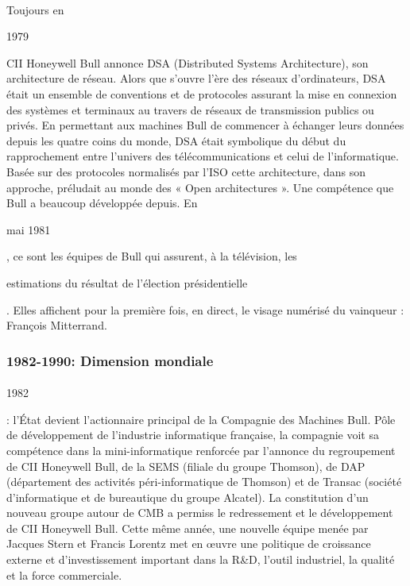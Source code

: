 \documentclass{article}
\begin{document}
		\paragraph{}
		Toujours en \begin{bf}1979\end{bf} CII Honeywell Bull annonce DSA (Distributed Systems Architecture), son 
		architecture de réseau. Alors que s’ouvre l’ère des réseaux d’ordinateurs, DSA était un ensemble de conventions et de 
		protocoles assurant la mise en connexion des systèmes et terminaux au travers de réseaux de transmission publics ou 
		privés. En permettant aux machines Bull de commencer à échanger leurs données depuis les quatre coins du monde, DSA 
		était symbolique du début du rapprochement entre l’univers des télécommunications et celui de l’informatique. Basée 
		sur des protocoles normalisés par l’ISO cette architecture, dans son approche, préludait au monde des « Open 
		architectures ». Une compétence que Bull a beaucoup développée depuis.\newline{}
		En \begin{bf}mai 1981\end{bf}, ce sont les équipes de Bull qui assurent, à la télévision, les \begin{bf}estimations 
		du résultat de l’élection présidentielle\end{bf}. Elles affichent pour la première fois, en direct, le visage numérisé du 
		vainqueur : François Mitterrand.
		\subsubsection{1982-1990: Dimension mondiale}
		\paragraph{}
		\begin{bf}1982\end{bf}: l’État devient l’actionnaire principal de la Compagnie des Machines Bull. Pôle de 
		développement de l’industrie informatique française, la compagnie voit sa compétence dans la mini-informatique 
		renforcée par l’annonce du regroupement de CII Honeywell Bull, de la SEMS (filiale du groupe Thomson), de DAP 
		(département des activités péri-informatique de Thomson) et de Transac (société d’informatique et de bureautique du 
		groupe Alcatel). La constitution d’un nouveau groupe autour de CMB a permiss le redressement et le développement de CII 
		Honeywell Bull.\newline{}
		Cette même année, une nouvelle équipe menée par Jacques Stern et Francis Lorentz met en œuvre une politique de 
		croissance externe et d’investissement important dans la R\&D, l’outil industriel, la qualité et la force commerciale.
\end{document}
